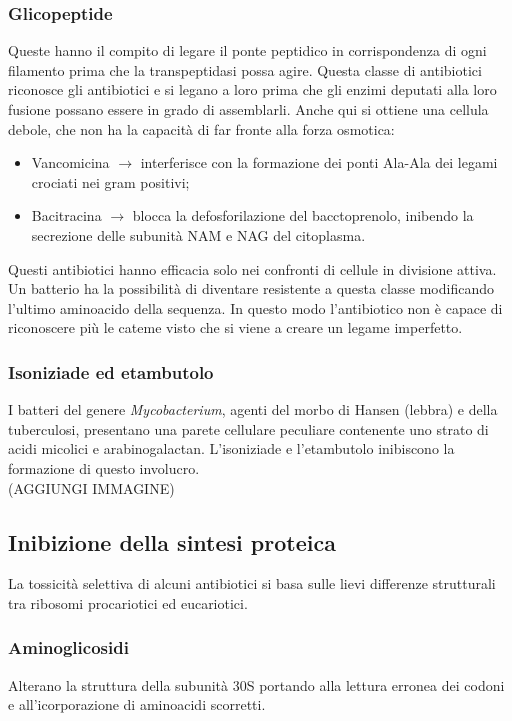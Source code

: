 \subsubsection{Glicopeptide}
Queste hanno il compito di legare il ponte peptidico in corrispondenza di ogni filamento prima che la transpeptidasi possa agire. Questa classe di antibiotici riconosce gli antibiotici e si legano a loro prima che gli enzimi deputati alla loro fusione possano essere in grado di assemblarli. Anche qui si ottiene una cellula debole, che non ha la capacità di far fronte alla forza osmotica:
\begin{itemize}
    \item Vancomicina $\xrightarrow{}$ interferisce con la formazione dei ponti Ala-Ala dei legami crociati nei gram positivi; 
    \item Bacitracina $\xrightarrow{}$ blocca la defosforilazione del bacctoprenolo, inibendo la secrezione delle subunità NAM e NAG del citoplasma. 
\end{itemize}
Questi antibiotici hanno efficacia solo nei confronti di cellule in divisione attiva.
\\Un batterio ha la possibilità di diventare resistente a questa classe modificando l'ultimo aminoacido della sequenza. In questo modo l'antibiotico non è capace di riconoscere più le cateme visto che si viene a creare un legame imperfetto.
\subsubsection{Isoniziade ed etambutolo}
I batteri del genere \textit{Mycobacterium}, agenti del morbo di Hansen (lebbra) e della tuberculosi, presentano una parete cellulare peculiare contenente uno strato di acidi micolici e arabinogalactan. L'isoniziade e l'etambutolo inibiscono la formazione di questo involucro. \\(AGGIUNGI IMMAGINE)
\subsection{Inibizione della sintesi proteica}
La tossicità selettiva di alcuni antibiotici si basa sulle lievi differenze strutturali tra ribosomi procariotici ed eucariotici. 
\subsubsection{Aminoglicosidi}
Alterano la struttura della subunità 30S portando alla lettura erronea dei codoni e all'icorporazione di aminoacidi scorretti.
